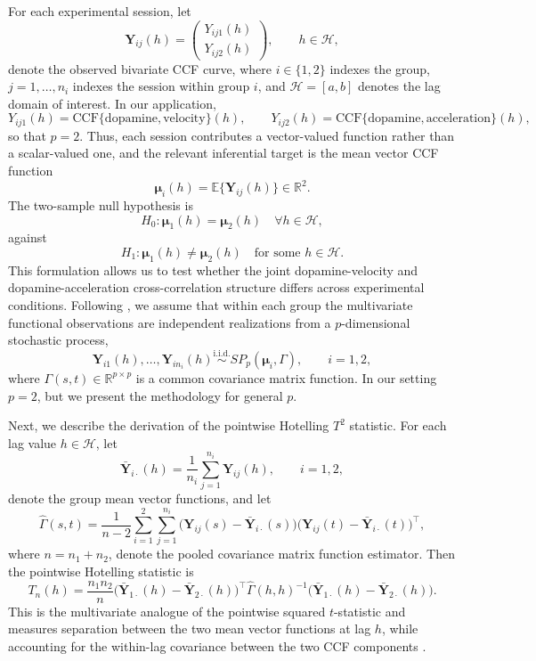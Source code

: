 \documentclass[12pt]{article}
\begin{document}
For each experimental session, let
\[
\mathbf Y_{ij}(h)=
\begin{pmatrix}
Y_{ij1}(h)\\
Y_{ij2}(h)
\end{pmatrix},
\qquad h\in\mathcal H,
\]
denote the observed bivariate CCF curve, where \(i\in\{1,2\}\) indexes the group, \(j=1,\ldots,n_i\) indexes the session within group \(i\), and \(\mathcal H=[a,b]\) denotes the lag domain of interest. In our application,
\[
Y_{ij1}(h)=\mathrm{CCF}\{\text{dopamine},\text{velocity}\}(h),\qquad
Y_{ij2}(h)=\mathrm{CCF}\{\text{dopamine},\text{acceleration}\}(h),
\]
so that \(p=2\). Thus, each session contributes a vector-valued function rather than a scalar-valued one, and the relevant inferential target is the mean vector CCF function
\[
\boldsymbol{\mu}_i(h)=\mathbb E\{\mathbf Y_{ij}(h)\}\in\mathbb R^2.
\]
The two-sample null hypothesis is
\[
H_0:\boldsymbol{\mu}_1(h)=\boldsymbol{\mu}_2(h)\quad \forall h\in\mathcal H,
\]
against
\[
H_1:\boldsymbol{\mu}_1(h)\neq \boldsymbol{\mu}_2(h)\quad \text{for some } h\in\mathcal H.
\]
This formulation allows us to test whether the joint dopamine-velocity and dopamine-acceleration cross-correlation structure differs across experimental conditions.
Following \citet{qiu2021multivariate}, we assume that within each group the multivariate functional observations are independent realizations from a \(p\)-dimensional stochastic process,
\[
\mathbf Y_{i1}(h),\ldots,\mathbf Y_{in_i}(h)\stackrel{\mathrm{i.i.d.}}{\sim} SP_p(\boldsymbol{\mu}_i,\Gamma),
\qquad i=1,2,
\]
where \(\Gamma(s,t)\in\mathbb R^{p\times p}\) is a common covariance matrix function. In our setting \(p=2\), but we present the methodology for general \(p\).

Next, we describe the derivation of the pointwise Hotelling \(T^2\) statistic.
For each lag value \(h\in\mathcal H\), let
\[
\bar{\mathbf Y}_{i\cdot}(h)=\frac{1}{n_i}\sum_{j=1}^{n_i}\mathbf Y_{ij}(h),
\qquad i=1,2,
\]
denote the group mean vector functions, and let
\[
\widehat{\Gamma}(s,t)
=
\frac{1}{n-2}\sum_{i=1}^2\sum_{j=1}^{n_i}
\bigl(\mathbf Y_{ij}(s)-\bar{\mathbf Y}_{i\cdot}(s)\bigr)
\bigl(\mathbf Y_{ij}(t)-\bar{\mathbf Y}_{i\cdot}(t)\bigr)^\top,
\]
where \(n=n_1+n_2\), denote the pooled covariance matrix function estimator. Then the pointwise Hotelling statistic is
\[
T_n(h)
=
\frac{n_1n_2}{n}
\bigl(\bar{\mathbf Y}_{1\cdot}(h)-\bar{\mathbf Y}_{2\cdot}(h)\bigr)^\top
\widehat{\Gamma}(h,h)^{-1}
\bigl(\bar{\mathbf Y}_{1\cdot}(h)-\bar{\mathbf Y}_{2\cdot}(h)\bigr).
\]
This is the multivariate analogue of the pointwise squared \(t\)-statistic and measures separation between the two mean vector functions at lag \(h\), while accounting for the within-lag covariance between the two CCF components \citep{qiu2021multivariate}.
\end{document}
